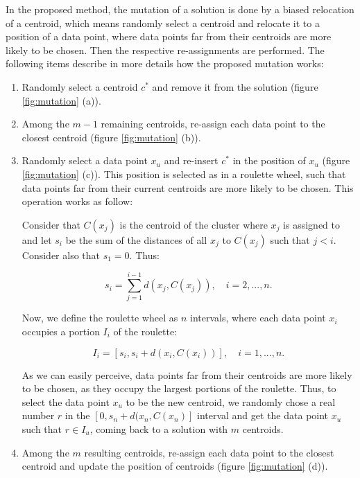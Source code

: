 In the proposed method, the mutation of a solution is done by a biased relocation of a centroid, which means randomly select a centroid and relocate it to a position of a data point, where data points far from their centroids are more likely to be chosen. Then the respective re-assignments are performed. The following items describe in more details how the proposed mutation works:

\begin{enumerate}

	\item Randomly select a centroid $c^{*}$ and remove it from the solution (figure \ref{fig:mutation} (a)).
	
	\item Among the $m-1$ remaining centroids, re-assign each data point to the closest centroid (figure \ref{fig:mutation} (b)).
	
	\item Randomly select a data point $x_u$ and re-insert $c^{*}$ in the position of $x_u$ (figure \ref{fig:mutation} (c)). This position is selected as in a roulette wheel, such that data points far from their current centroids are more likely to be chosen. This operation works as follow:
	
	Consider that $C(x_j)$ is the centroid of the cluster where $x_j$ is assigned to and let $s_i$ be the sum of the distances of all $x_j$ to $C(x_j)$ such that $j < i$. Consider also that $s_1 = 0$. Thus:
	
	\begin{equation}
	s_i = \sum_{j=1}^{i-1} d(x_j, C(x_j)), \quad i = 2, ..., n.
	\end{equation}
	
	Now, we define the roulette wheel as $n$ intervals, where each data point $x_i$ occupies a portion $I_i$ of the roulette:
	
	\begin{equation}
	I_i = [ s_i, s_i + d(x_i, C(x_i)) ], \quad i = 1, ..., n.
	\end{equation}
	
	As we can easily perceive, data points far from their centroids are more likely to be chosen, as they occupy the largest portions of the roulette. Thus, to select the data point $x_u$ to be the new centroid, we randomly chose a real number $r$ in the $[ 0, s_n + d(x_n, C(x_n) ]$ interval and get the data point $x_u$ such that $r \in I_u$, coming back to a solution with $m$ centroids.
	
	\item Among the $m$ resulting centroids, re-assign each data point to the closest centroid and update the position of centroids (figure \ref{fig:mutation} (d)).
		
\end{enumerate}

